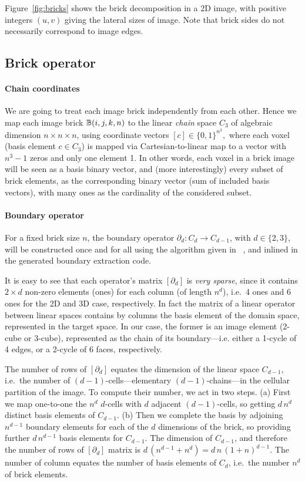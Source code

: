 Figure~\ref{fig:bricks} shows the brick decomposition in a 2D image, with positive integers $(u,v)$ giving the lateral sizes of image. Note that brick sides do not necessarily correspond to image edges. 


\subsection{Brick operator }\label{sec:brick}

\paragraph{Chain coordinates }\label{sec:chain-coords}
We are going to treat each image brick independently from each other. Hence we map each image brick $\mathbb{B}(i,j,k,n)$ to the linear \emph{chain} space $C_3$ of algebraic dimension $n\times n\times n$, using coordinate vectors $[c] \in \{0,1\}^{n^3},$ where each voxel (basis element $c \in C_3$) is mapped via Cartesian-to-linear map to a vector with $n^3-1$ zeros and only one element 1.
In other words, each voxel in a brick image will be seen as a basis binary vector, and (more interestingly) every subset of brick elements, as the corresponding binary vector (sum of included basis vectors), with many ones as the cardinality of the considered  subset.

\paragraph{Boundary operator }\label{sec:boundary-operator}
For a fixed brick size $n$, the boundary operator $\partial_d : C_d\to C_{d-1}$, with $d\in\{2,3\}$, will be constructed once and for all using the algorithm given in~
\cite{TSAS}, 
and inlined in the generated boundary extraction code.

It is easy to see that each operator's matrix $[\partial_d]$ is \emph{very sparse}, since it contains $2\times d$ non-zero elements (ones) for each column (of length $n^d$), i.e.~4 ones and 6 ones for the 2D and 3D case, respectively. In fact the matrix of a linear operator between linear spaces contains by columns the basis element of the domain space, represented in the target space. In our case, the former is an image element (2-cube or 3-cube), represented as the chain of its boundary---i.e. either a 1-cycle of 4 edges, or  a 2-cycle of 6 faces, respectively.  

The number of rows of $[\partial_d]$ equates the dimension of the linear space $C_{d-1}$, i.e.~the number of $(d-1)$-cells---elementary $(d-1)$-chains---in the cellular partition of the image. To compute their number, we act in two steps. (a) First we map one-to-one the $n^d$ $d$-cells with $d$ adjacent $(d-1)$-cells, so getting $d\,n^d$ distinct basis elements of $C_{d-1}$. (b) Then we complete the basis by adjoining $n^{d-1}$ boundary elements for each of the $d$ dimensions of the brick, so providing further $d\,n^{d-1}$ basis elements for $C_{d-1}$. The dimension of $C_{d-1}$, and therefore the number of rows of $[\partial_d]$ matrix is $d\,(n^{d-1}+n^{d}) = d\,n\,(1+n)^{d-1}$. The number of column equates the number of basis elements of $C_d$, i.e.~the number $n^d$ of brick elements.

